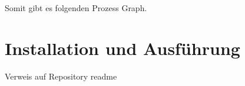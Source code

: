 Somit gibt es folgenden Prozess Graph.






\section{Installation und Ausführung}
Verweis auf Repository readme